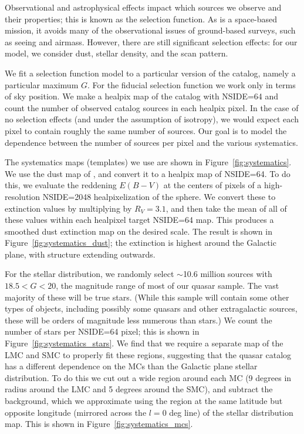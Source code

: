 Observational and astrophysical effects impact which sources we observe and their properties; this is known as the selection function. 
As \Gaia is a space-based mission, it avoids many of the observational issues of ground-based surveys, such as seeing and airmass.
However, there are still significant selection effects: for our model, we consider dust, stellar density, and the \Gaia scan pattern.

We fit a selection function model to a particular version of the catalog, namely a particular maximum $G$.
For the fiducial selection function we work only in terms of sky position.
We make a healpix map of the catalog with NSIDE=64 and count the number of observed catalog sources in each healpix pixel.
In the case of no selection effects (and under the assumption of isotropy), we would expect each pixel to contain roughly the same number of sources.
Our goal is to model the dependence between the number of sources per pixel and the various systematics.

The systematics maps (templates) we use are shown in Figure~\ref{fig:systematics}. 
We use the dust map of \cite{schlafly_measuring_2011}, and convert it to a healpix map of NSIDE=64.
To do this, we evaluate the reddening $E(B-V)$ at the centers of pixels of a high-resolution NSIDE=2048 healpixelization of the sphere.
We convert these to extinction values by multiplying by $R_V=3.1$, and then take the mean of all of these values within each healpixel target NSIDE=64 map.
This produces a smoothed dust extinction map on the desired scale.
The result is shown in Figure~\ref{fig:systematics_dust}; the extinction is highest around the Galactic plane, with structure extending outwards.

For the stellar distribution, we randomly select $\sim$10.6 million \Gaia sources with $18.5<G<20$, the magnitude range of most of our quasar sample.
The vast majority of these will be true stars.
(While this sample will contain some other types of objects, including possibly some quasars and other extragalactic sources, these will be orders of magnitude less numerous than stars.)
We count the number of stars per NSIDE=64 pixel; this is shown in Figure~\ref{fig:systematics_stars}.
We find that we require a separate map of the LMC and SMC to properly fit these regions, suggesting that the quasar catalog has a different dependence on the MCs than the Galactic plane stellar distribution.
To do this we cut out a wide region around each MC (9 degrees in radius around the LMC and 5 degrees around the SMC), and subtract the background, which we approximate using the region at the same latitude but opposite longitude (mirrored across the $l=0$ deg line) of the stellar distribution map.
This is shown in Figure~\ref{fig:systematics_mcs}.

